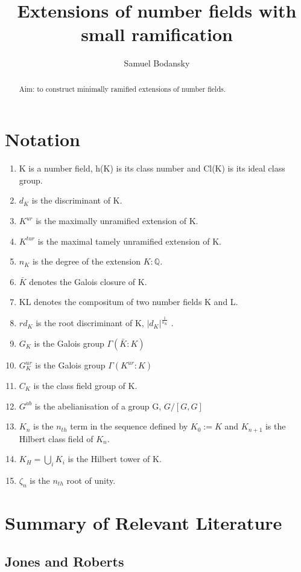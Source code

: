 \documentclass[preprint,12pt,reqno]{elsarticle}
\begin{document}
\begin{frontmatter}
\title{Extensions of number fields with small ramification}
\author{Samuel Bodansky}
\address{Oxford,UK}
\begin{abstract}
Aim: to construct minimally ramified extensions of number fields.
\end{abstract}
\end{frontmatter}
\section{Notation}
\begin{enumerate}
    \item K is a number field, h(K) is its class number and Cl(K) is its ideal class group.
    \item $d_K$ is the discriminant of K.
    \item $K^{ur}$ is the maximally unramified extension of K.
    \item $K^{tur}$ is the maximal tamely unramified extension of K.
    \item $n_K$ is the degree of the extension $K:\mathbb{Q}$.
    \item $\bar{K}$ denotes the Galois closure of K.
    \item KL denotes the compositum of two number fields K and L.
    \item $rd_K$ is the root discriminant of K, $|d_K|^\frac{1}{n_K}$ .
    \item $G_K$ is the Galois group $\Gamma(\bar{K}:K)$
    \item $G_K^{ur}$ is the Galois group $\Gamma(K^{ur}:K)$
    \item $C_K$ is the class field group of K. 
    \item $G^{ab}$ is the abelianisation of a group G, $G/[G,G]$
    \item $K_n$ is the $n_{th}$ term in the sequence defined by $K_0:=K$ and $K_{n+1}$ is the Hilbert class field of $K_n$.
    \item $K_H=\bigcup_{i}K_{i}$ is the Hilbert tower of K.  
    \item $\zeta_n$ is the $n_{th}$ root of unity. 
\end{enumerate}
\section{Summary of Relevant Literature}
\subsection{Jones and Roberts}
\end{document}
